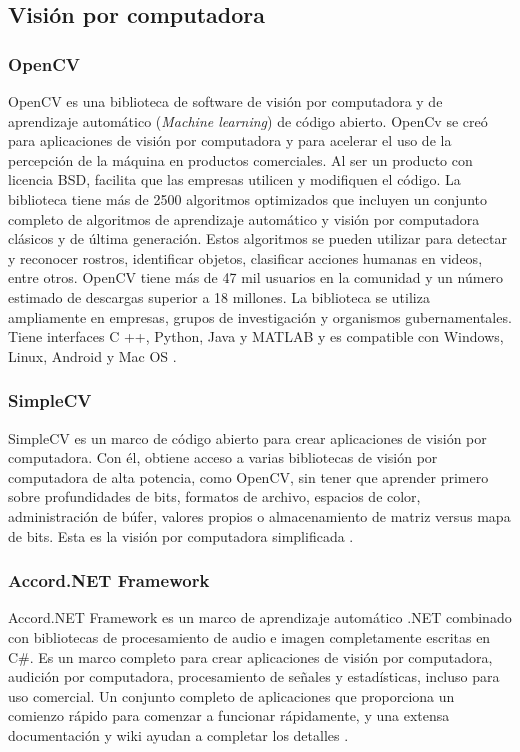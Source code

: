 \subsection*{Visión por computadora}
\subsubsection*{OpenCV}
OpenCV es una biblioteca de software de visión por computadora y de aprendizaje automático (\textit{Machine learning}) de código abierto. OpenCv se creó para aplicaciones de visión por computadora y para acelerar el uso de la percepción de la máquina en productos comerciales. Al ser un producto con licencia BSD, facilita que las empresas utilicen y modifiquen el código. La biblioteca tiene más de 2500 algoritmos optimizados que incluyen un conjunto completo de algoritmos de aprendizaje automático y visión por computadora clásicos y de última generación. Estos algoritmos se pueden utilizar para detectar y reconocer rostros, identificar objetos, clasificar acciones humanas en videos, entre otros. OpenCV tiene más de 47 mil usuarios en la comunidad y un número estimado de descargas superior a 18 millones. La biblioteca se utiliza ampliamente en empresas, grupos de investigación y organismos gubernamentales. Tiene interfaces C ++, Python, Java y MATLAB y es compatible con Windows, Linux, Android y Mac OS \cite{OpenCV}.

\subsubsection*{SimpleCV}
SimpleCV es un marco de código abierto para crear aplicaciones de visión por computadora. Con él, obtiene acceso a varias bibliotecas de visión por computadora de alta potencia, como OpenCV, sin tener que aprender primero sobre profundidades de bits, formatos de archivo, espacios de color, administración de búfer, valores propios o almacenamiento de matriz versus mapa de bits. Esta es la visión por computadora simplificada \cite{SimpleCV}.

\subsubsection*{Accord.NET Framework}
Accord.NET Framework es un marco de aprendizaje automático .NET combinado con bibliotecas de procesamiento de audio e imagen completamente escritas en C\#. Es un marco completo para crear aplicaciones de visión por computadora, audición por computadora, procesamiento de señales y estadísticas, incluso para uso comercial. Un conjunto completo de aplicaciones que proporciona un comienzo rápido para comenzar a funcionar rápidamente, y una extensa documentación y wiki ayudan a completar los detalles \cite{Accord.NET}.


